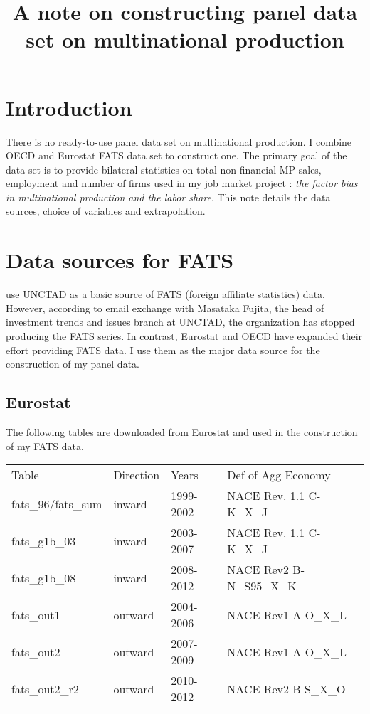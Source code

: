 \documentclass[notitlepage,11pt]{article}%
\begin{document}
\title{A note on constructing panel data set on multinational production}

\section{{Introduction}}

There is no ready-to-use panel data set on multinational production. I combine
OECD and Eurostat FATS data set to construct one. The primary goal of the data
set is to provide bilateral statistics on total non-financial MP sales,
employment and number of firms used in my job market project : \emph{the
factor bias in multinational production and the labor share}. This note
details the data sources, choice of variables and extrapolation.

\section{Data sources for FATS}

\cite{ramondo_multinational_2015} use UNCTAD as a basic source of FATS
(foreign affiliate statistics) data. However, according to email exchange with
Masataka Fujita, the head of investment trends and issues branch at UNCTAD,
the organization has stopped producing the FATS series. In contrast, Eurostat
and OECD have expanded their effort providing FATS data. I use them as the
major data source for the construction of my panel data.

\subsection{Eurostat}

The following tables are downloaded from Eurostat and used in the construction
of my FATS data.%

\begin{tabular}
[c]{llll}%
Table & Direction & Years & Def of Agg Economy\\
fats\_96/fats\_sum & inward & 1999-2002 & NACE Rev. 1.1 C-K\_X\_J\\
fats\_g1b\_03 & inward & 2003-2007 & NACE Rev. 1.1 C-K\_X\_J\\
fats\_g1b\_08 & inward & 2008-2012 & NACE Rev2 B-N\_S95\_X\_K\\
fats\_out1 & outward & 2004-2006 & NACE Rev1 A-O\_X\_L\\
fats\_out2 & outward & 2007-2009 & NACE Rev1 A-O\_X\_L\\
fats\_out2\_r2 & outward & 2010-2012 & NACE Rev2 B-S\_X\_O
\end{tabular}
\end{document}
